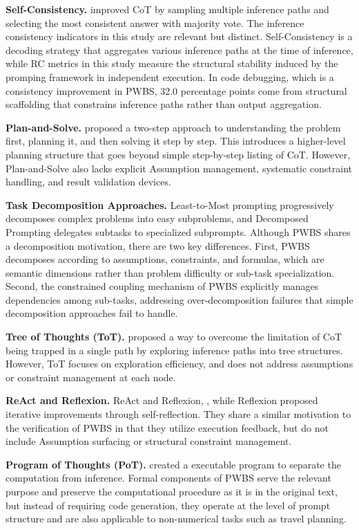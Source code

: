 \documentclass[11pt,a4paper]{article}
\begin{document}
\textbf{Self-Consistency.} \citet{wang2023selfconsistency} improved CoT by sampling multiple inference paths and selecting the most consistent answer with majority vote. The inference consistency indicators in this study are relevant but distinct. Self-Consistency is a decoding strategy that aggregates various inference paths at the time of inference, while RC metrics in this study measure the structural stability induced by the promping framework in independent execution. In code debugging, which is a consistency improvement in PWBS, 32.0 percentage points come from structural scaffolding that constrains inference paths rather than output aggregation.

\textbf{Plan-and-Solve.} \citet{wang2023plan} proposed a two-step approach to understanding the problem first, planning it, and then solving it step by step. This introduces a higher-level planning structure that goes beyond simple step-by-step listing of CoT. However, Plan-and-Solve also lacks explicit Assumption management, systematic constraint handling, and result validation devices.

\textbf{Task Decomposition Approaches.} Least-to-Most prompting \citep{zhou2023leasttomost} progressively decomposes complex problems into easy subproblems, and Decomposed Prompting delegates subtasks to specialized subprompts. Although PWBS shares a decomposition motivation, there are two key differences. First, PWBS decomposes according to assumptions, constraints, and formulas, which are semantic dimensions rather than problem difficulty or sub-task specialization. Second, the constrained coupling mechanism of PWBS explicitly manages dependencies among sub-tasks, addressing over-decomposition failures that simple decomposition approaches fail to handle.

\textbf{Tree of Thoughts (ToT).} \citet{yao2024tree} proposed a way to overcome the limitation of CoT being trapped in a single path by exploring inference paths into tree structures. However, ToT focuses on exploration efficiency, and does not address assumptions or constraint management at each node.

\textbf{ReAct and Reflexion.} ReAct \citep{yao2023react} and Reflexion, , while Reflexion \citep{shinn2023reflexion} proposed iterative improvements through self-reflection. They share a similar motivation to the verification of PWBS in that they utilize execution feedback, but do not include Assumption surfacing or structural constraint management.

\textbf{Program of Thoughts (PoT).} \citet{chen2023program} created a executable program to separate the computation from inference. Formal components of PWBS serve the relevant purpose and preserve the computational procedure as it is in the original text, but instead of requiring code generation, they operate at the level of prompt structure and are also applicable to non-numerical tasks such as travel planning.
\end{document}
